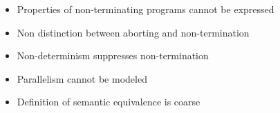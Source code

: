 \begin{itemize}
\begin{itemize}
        \end{itemize}
        \begin{itemize}
            \item Properties of non-terminating programs cannot be expressed
            \item Non distinction between aborting and non-termination
            \item Non-determinism suppresses non-termination
            \item Parallelism cannot be modeled
            \item Definition of semantic equivalence is coarse
        \end{itemize}
\end{itemize}

